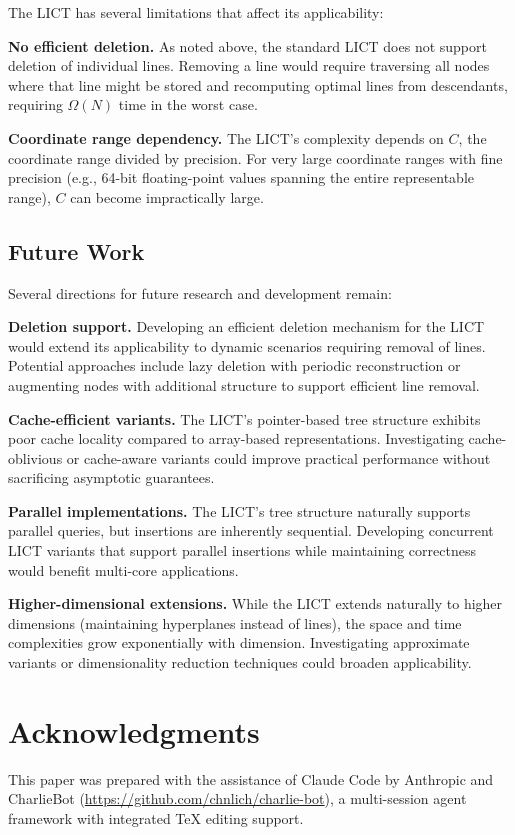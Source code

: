 \documentclass[11pt,a4paper]{article}
\theoremstyle{definition}
\theoremstyle{plain}
\begin{document}
The LICT has several limitations that affect its applicability:

\textbf{No efficient deletion.} As noted above, the standard LICT does not support deletion of individual lines. Removing a line would require traversing all nodes where that line might be stored and recomputing optimal lines from descendants, requiring $\Omega(N)$ time in the worst case.

\textbf{Coordinate range dependency.} The LICT's complexity depends on $C$, the coordinate range divided by precision. For very large coordinate ranges with fine precision (e.g., 64-bit floating-point values spanning the entire representable range), $C$ can become impractically large.

\subsection{Future Work}

Several directions for future research and development remain:

\textbf{Deletion support.} Developing an efficient deletion mechanism for the LICT would extend its applicability to dynamic scenarios requiring removal of lines. Potential approaches include lazy deletion with periodic reconstruction or augmenting nodes with additional structure to support efficient line removal.

\textbf{Cache-efficient variants.} The LICT's pointer-based tree structure exhibits poor cache locality compared to array-based representations. Investigating cache-oblivious or cache-aware variants could improve practical performance without sacrificing asymptotic guarantees.

\textbf{Parallel implementations.} The LICT's tree structure naturally supports parallel queries, but insertions are inherently sequential. Developing concurrent LICT variants that support parallel insertions while maintaining correctness would benefit multi-core applications.

\textbf{Higher-dimensional extensions.} While the LICT extends naturally to higher dimensions (maintaining hyperplanes instead of lines), the space and time complexities grow exponentially with dimension. Investigating approximate variants or dimensionality reduction techniques could broaden applicability.

\section*{Acknowledgments}
This paper was prepared with the assistance of Claude Code by Anthropic and CharlieBot (\url{https://github.com/chnlich/charlie-bot}), a multi-session agent framework with integrated \TeX{} editing support.
\end{document}
